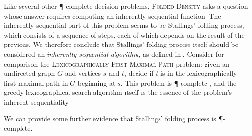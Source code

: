\documentclass{article}
\newcommand{\FD}{\textsc{Folded Density}}
\begin{document}
Like several other \P-complete decision problems, \FD{} asks a question whose answer requires computing an inherently sequential function.
The inherently sequential part of this problem seems to be Stallings' folding process, which consists of a sequence of steps, each of which depends on the result of the previous.
We therefore conclude that Stallings' folding process itself should be considered an \emph{inherently sequential algorithm}, as defined in \cite[Chapter~8]{ghr95}.
Consider for comparison the \textsc{Lexicographically First Maximal Path} problem: given an undirected graph $G$ and vertices $s$ and $t$, decide if $t$ is in the lexicographically first maximal path in $G$ beginning at $s$.
This problem is \P-complete \cite[Problem~A.3.1]{ghr95}, and the greedy lexicographical search algorithm itself is the essence of the problem's inherent sequentiality.

We can provide some further evidence that Stallings' folding process is \P-complete.
\end{document}
